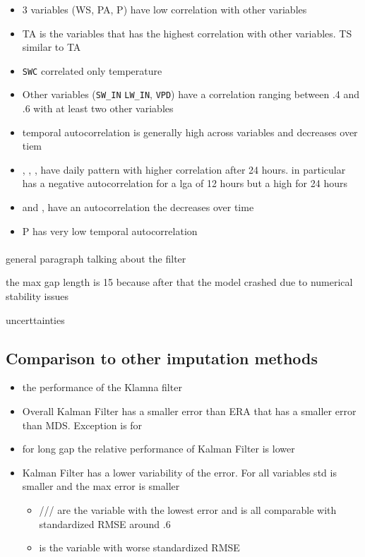 \documentclass{article}
\let\Oldsubsection\subsection
\renewcommand{\subsection}{\FloatBarrier\Oldsubsection}
\begin{document}
\begin{itemize}
    \item 3 variables (WS, PA, P) have low correlation with other variables
    \item TA is the variables that has the highest correlation with other variables. TS similar to TA
    \item \texttt{SWC} correlated only temperature
    \item Other variables (\texttt{SW\_IN} \texttt{LW\_IN}, \texttt{VPD}) have a correlation ranging between .4 and .6 with at least two other variables
    \item temporal autocorrelation is generally high across variables and decreases over tiem 
    \item {}, , ,  have daily pattern with higher correlation after 24 hours. in particular  has a negative autocorrelation for a lga of 12 hours but a high for 24 hours 
    \item {} and ,  have an autocorrelation the decreases over time
    \item P has very low temporal autocorrelation
\end{itemize}


\paragraph{}

general paragraph talking about the filter

the max gap length is 15 because after that the model crashed due to numerical stability
issues

uncerttainties

\subsection{Comparison to other imputation methods}

\begin{itemize}
    \item the performance of the Klamna filter  
    \item Overall Kalman Filter has a smaller error than ERA that has a smaller error than MDS. Exception is for 
    \item for long gap the relative performance of Kalman Filter is lower
    \item Kalman Filter has a lower variability of the error. For all variables std is smaller and the max error is smaller
    \begin{itemize}
    \item {}/// are the variable with the lowest error and is all comparable with standardized RMSE around .6
    \item {} is the variable with worse standardized RMSE 
\end{itemize}
\end{itemize}
\end{document}
